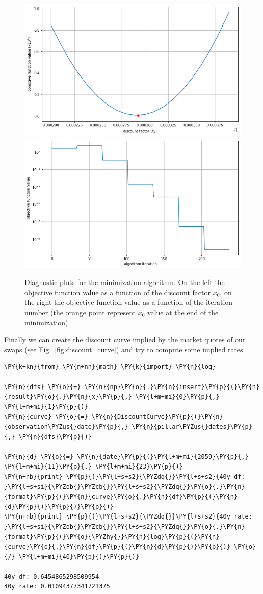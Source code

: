 \begin{figure}[htb]
	\centering
	\includegraphics[width=0.45\linewidth]{figures/obj_func.png}
	\includegraphics[width=0.45\linewidth]{figures/obj_func_iter.png}
	\caption{Diagnostic plots for the minimization algorithm. On the left the objective function value as a function of the discount factor $x_0$, on the right the objective function value as a function of the iteration number (the orange point represent $x_0$ value at the end of the minimization).}
	\label{fig:minimization_diagnostic}
\end{figure}

Finally we can create the discount curve implied by the market quotes of
our swaps (see Fig.~\ref{fig:discount_curve}) and try to compute some implied rates.

\begin{codebox}
\begin{Verbatim}[commandchars=\\\{\}]
\PY{k+kn}{from} \PY{n+nn}{math} \PY{k}{import} \PY{n}{log}
	
\PY{n}{dfs} \PY{o}{=} \PY{n}{np}\PY{o}{.}\PY{n}{insert}\PY{p}{(}\PY{n}{result}\PY{o}{.}\PY{n}{x}\PY{p}{,} \PY{l+m+mi}{0}\PY{p}{,} \PY{l+m+mi}{1}\PY{p}{)}
\PY{n}{curve} \PY{o}{=} \PY{n}{DiscountCurve}\PY{p}{(}\PY{n}{observation\PYZus{}date}\PY{p}{,} \PY{n}{pillar\PYZus{}dates}\PY{p}{,} \PY{n}{dfs}\PY{p}{)}
	
\PY{n}{d} \PY{o}{=} \PY{n}{date}\PY{p}{(}\PY{l+m+mi}{2059}\PY{p}{,} \PY{l+m+mi}{11}\PY{p}{,} \PY{l+m+mi}{23}\PY{p}{)}
\PY{n+nb}{print} \PY{p}{(}\PY{l+s+s2}{\PYZdq{}}\PY{l+s+s2}{40y df: }\PY{l+s+si}{\PYZob{}\PYZcb{}}\PY{l+s+s2}{\PYZdq{}}\PY{o}{.}\PY{n}{format}\PY{p}{(}\PY{n}{curve}\PY{o}{.}\PY{n}{df}\PY{p}{(}\PY{n}{d}\PY{p}{)}\PY{p}{)}\PY{p}{)}
\PY{n+nb}{print} \PY{p}{(}\PY{l+s+s2}{\PYZdq{}}\PY{l+s+s2}{40y rate: }\PY{l+s+si}{\PYZob{}\PYZcb{}}\PY{l+s+s2}{\PYZdq{}}\PY{o}{.}\PY{n}{format}\PY{p}{(}\PY{o}{\PYZhy{}}\PY{n}{log}\PY{p}{(}\PY{n}{curve}\PY{o}{.}\PY{n}{df}\PY{p}{(}\PY{n}{d}\PY{p}{)}\PY{p}{)} \PY{o}{/} \PY{l+m+mi}{40}\PY{p}{)}\PY{p}{)}             
	
40y df: 0.6454865298509954
40y rate: 0.01094377341721375
\end{Verbatim}
\end{codebox}

